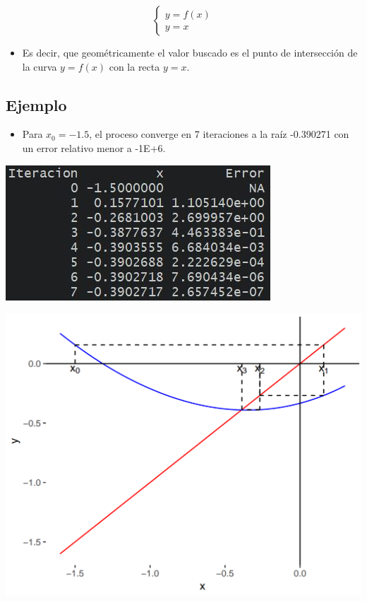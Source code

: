 \documentclass[]{book}
\providecommand{\tightlist}{%
  \setlength{\itemsep}{0pt}\setlength{\parskip}{0pt}}
\begin{document}
\begin{equation}
  \begin{cases}
    y = f(x) \\
    y = x
  \end{cases}
\end{equation}

\begin{itemize}
\tightlist
\item
  Es decir, que geométricamente el valor buscado es el punto de intersección de la curva \(y=f(x)\) con la recta \(y=x\).
\end{itemize}

\hypertarget{ejemplo-5}{%
\subsection{Ejemplo}\label{ejemplo-5}}

\begin{itemize}
\tightlist
\item
  Para \(x_0 = -1.5\), el proceso converge en 7 iteraciones a la raíz -0.390271 con un error relativo menor a -1E+6.
\end{itemize}

\begin{center}\includegraphics[width=1\linewidth]{Plots/U2/rtdo} \end{center}

\begin{center}\includegraphics[width=1\linewidth]{Plots/U2/f3} \end{center}
\end{document}
